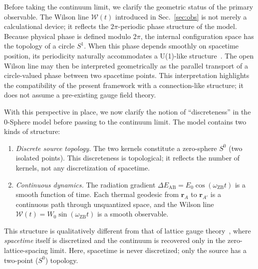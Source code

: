 \documentclass[%
 reprint, amsmath,amssymb, aps, prb, ]{revtex4-2}
\numberwithin{equation}{section}
\newcommand{\omZB}{\omega_{\text{ZB}}}
\newcommand{\Egrad}{\Delta E_{\text{AB}}}
\newcommand{\WL}{\mathcal{W}}
\begin{document}
Before taking the continuum limit, we clarify the geometric status of the primary observable. The Wilson line $\WL(t)$ introduced in Sec.~\ref{sec:obs} is not merely a calculational device; it reflects the $2\pi$-periodic phase structure of the model. Because physical phase is defined modulo $2\pi$, the internal configuration space has the topology of a circle $S^1$. When this phase depends smoothly on spacetime position, its periodicity naturally accommodates a U(1)-like structure~\cite{WuYang1975,Nakahara2003}. The open Wilson line may then be interpreted geometrically as the parallel transport of a circle-valued phase between two spacetime points. This interpretation highlights the compatibility of the present framework with a connection-like structure; it does not assume a pre-existing gauge field theory.

With this perspective in place, we now clarify the notion of ``discreteness'' in the 0-Sphere model before passing to the continuum limit. The model contains two kinds of structure:
\begin{enumerate}[label=(\alph*)]
\item \textit{Discrete source topology.} The two kernels constitute a zero-sphere $S^0$ (two isolated points). This discreteness is topological; it reflects the number of kernels, not any discretization of spacetime.
\item \textit{Continuous dynamics.} The radiation gradient $\Egrad = E_0\cos(\omZB t)$ is a smooth function of time. Each thermal geodesic from $\mathbf{r}_A$ to $\mathbf{r}_{A'}$ is a continuous path through unquantized space, and the Wilson line $\WL(t)=W_0\sin(\omZB t)$ is a smooth observable.
\end{enumerate}
This structure is qualitatively different from that of lattice gauge theory~\cite{Wilson1974}, where \emph{spacetime} itself is discretized and the continuum is recovered only in the zero-lattice-spacing limit. Here, spacetime is never discretized; only the source has a two-point ($S^0$) topology.
\end{document}

